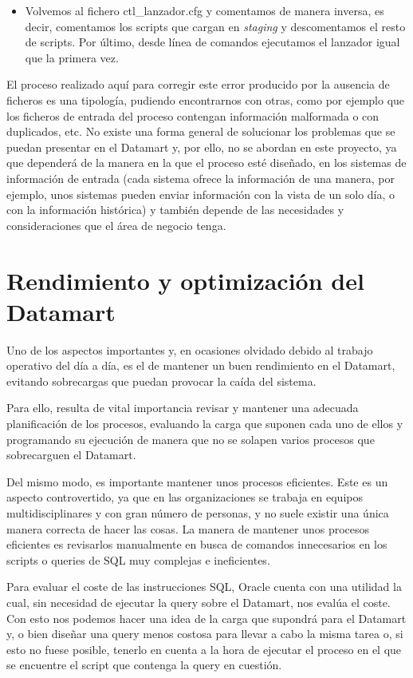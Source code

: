 \documentclass[a4paper, 12pt]{book}
\begin{document}
\begin{enumerate}
\begin{itemize}
	\item Volvemos al fichero ctl\_lanzador.cfg y comentamos de manera inversa, es decir, comentamos los scripts que cargan en \textit{staging} y descomentamos el resto de scripts. Por último, desde línea de comandos ejecutamos el lanzador igual que la primera vez.
\end{itemize}
El proceso realizado aquí para corregir este error producido por la ausencia de ficheros es una tipología, pudiendo encontrarnos con otras, como por ejemplo que los ficheros de entrada del proceso contengan información malformada o con duplicados, etc. No existe una forma general de solucionar los problemas que se puedan presentar en el Datamart y, por ello, no se abordan en este proyecto, ya que dependerá de la manera en la que el proceso esté diseñado, en los sistemas de información de entrada (cada sistema ofrece la información de una manera, por ejemplo, unos sistemas pueden enviar información con la vista de un solo día, o con la información histórica) y también depende de las necesidades y consideraciones que el área de negocio tenga. 

\section{Rendimiento y optimización del Datamart} 
\label{sec:rendimiento}
Uno de los aspectos importantes y, en ocasiones olvidado debido al trabajo operativo del día a día, es el de mantener un buen rendimiento en el Datamart, evitando sobrecargas que puedan provocar la caída del sistema.

Para ello, resulta de vital importancia revisar y mantener una adecuada planificación de los procesos, evaluando la carga que suponen cada uno de ellos y programando su ejecución de manera que no se solapen varios procesos que sobrecarguen el Datamart.

Del mismo modo, es importante mantener unos procesos eficientes. Este es un aspecto controvertido, ya que en las organizaciones se trabaja en equipos multidisciplinares y con gran número de personas, y no suele existir una única manera correcta de hacer las cosas. La manera de mantener unos procesos eficientes es revisarlos manualmente en busca de comandos innecesarios en los scripts o queries de SQL muy complejas e ineficientes.

Para evaluar el coste de las instrucciones SQL, Oracle cuenta con una utilidad la cual, sin necesidad de ejecutar la query sobre el Datamart, nos evalúa el coste. Con esto nos podemos hacer una idea de la carga que supondrá para el Datamart y, o bien diseñar una query menos costosa para llevar a cabo la misma tarea o, si esto no fuese posible, tenerlo en cuenta a la hora de ejecutar el proceso en el que se encuentre el script que contenga la query en cuestión.
\end{enumerate}
\end{document}

